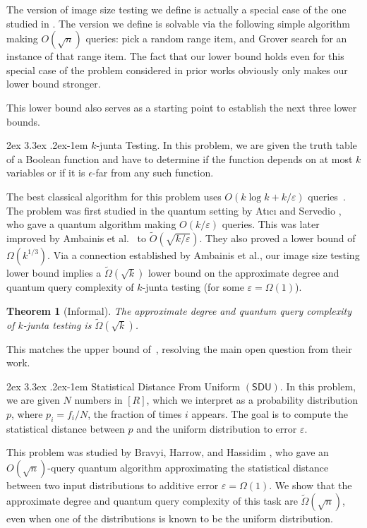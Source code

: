\documentclass[11pt, letterpaper, fleqn]{article}
\makeatletter
\newcommand{\para}{
  \@startsection{paragraph}{4}
  {\z@}{2ex \@plus 3.3ex \@minus .2ex}{-1em}
  {\normalfont\normalsize\bfseries}
}
\newtheorem{theorem}{Theorem}
\theoremstyle{plain}
\newcommand{\SDU}{\mathsf{ SDU}}
\newcommand{\eps}{\varepsilon}
\makeatother
\begin{document}
The version of image size testing we define is actually a special case of the one studied in \cite{juntatesting}. The version we define is solvable via the following simple algorithm making $O(\sqrt{n})$ queries: pick a random range item, and Grover search for an instance of that range item.  The fact that our lower bound holds even for this special case of the problem considered in prior works obviously only makes our lower bound stronger.

This lower bound also serves as a starting point to establish the next three lower bounds.


\para{$k$-junta Testing.} In this problem, we are given the truth table of a Boolean function and have to determine if the function depends on at most $k$ variables or if it is $\epsilon$-far from any such function. 

The best classical algorithm for this problem uses $O(k \log k+k/\eps)$ queries~\cite{Bla09}. The problem was first studied in the quantum setting by  At{\i}c{\i} and Servedio \cite{roccoquantum}, who gave a quantum algorithm making $O(k/\eps)$ queries. This was later improved by Ambainis et al.~\cite{juntatesting} to $\tilde{O}(\sqrt{k/\eps})$. They also proved a lower bound of $\Omega(k^{1/3})$. 
Via a connection established by Ambainis et al., our image size testing lower bound implies a $\tilde{\Omega}(\sqrt{k})$ lower bound on the approximate degree and quantum query complexity of $k$-junta testing (for some $\eps=\Omega(1)$). 

\begin{theorem}[Informal]  \label{thm:juntatesting} The approximate degree and quantum query complexity of $k$-junta testing 
is $\tilde{\Omega}(\sqrt{k})$. \end{theorem}

This matches the upper bound of~\cite{juntatesting}, resolving the main open question from their work. 


\para{Statistical Distance From Uniform $(\SDU)$.} In this problem, we are given $N$ numbers in $[R]$, which we interpret 
as a probability distribution $p$, where $p_i=f_i/N$, the fraction of times $i$ appears.
The goal is to compute the statistical distance between $p$ and the uniform distribution to error $\eps$.

This problem was studied by Bravyi, Harrow, and Hassidim \cite{bravyi}, who gave an $O(\sqrt{n})$-query quantum algorithm approximating the statistical distance between
 two input distributions to additive error $\eps=\Omega(1)$.
We show that the approximate degree and quantum query complexity of this task are $\tilde{\Omega}(\sqrt{n})$, even when one of the distributions is known to be the uniform distribution. 
\end{document}
